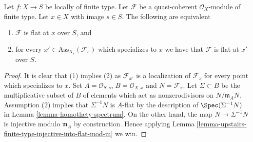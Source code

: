 \begin{theorem}
\label{theorem-check-flatness-at-associated-points}
Let $f : X \to S$ be locally of finite type.
Let $\mathcal{F}$ be a quasi-coherent $\mathcal{O}_X$-module of finite type.
Let $x \in X$ with image $s \in S$.
The following are equivalent
\begin{enumerate}
\item $\mathcal{F}$ is flat at $x$ over $S$, and
\item for every $x' \in \text{Ass}_{X_s}(\mathcal{F}_s)$ which
specializes to $x$ we have that $\mathcal{F}$ is flat at $x'$ over $S$.
\end{enumerate}
\end{theorem}

\begin{proof}
It is clear that (1) implies (2) as $\mathcal{F}_{x'}$ is a localization
of $\mathcal{F}_x$ for every point which specializes to $x$.
Set $A = \mathcal{O}_{S, s}$, $B = \mathcal{O}_{X, x}$ and
$N = \mathcal{F}_x$. Let $\Sigma \subset B$ be the multiplicative
subset of $B$ of elements which act as nonzerodivisors on $N/\mathfrak m_AN$.
Assumption (2) implies that $\Sigma^{-1}N$ is $A$-flat by the description
of $\Spec(\Sigma^{-1}N)$ in
Lemma \ref{lemma-homothety-spectrum}.
On the other hand, the map $N \to \Sigma^{-1}N$ is injective modulo
$\mathfrak m_A$ by construction. Hence applying
Lemma \ref{lemma-upstairs-finite-type-injective-into-flat-mod-m}
we win.
\end{proof}
